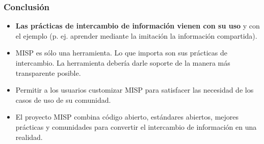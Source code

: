 \begin{frame}
        \frametitle{Conclusión}
        \begin{itemize}
                \item {\bf Las prácticas de intercambio de información vienen con su uso} y con el ejemplo (p. ej. aprender mediante la imitación la información compartida).
                \item MISP es sólo una herramienta. Lo que importa son sus prácticas de intercambio. La herramienta debería darle soporte de la manera más transparente posible.
                \item Permitir a los usuarios customizar MISP para satisfacer las necesidad de los casos de uso de su comunidad.
                \item El proyecto MISP combina código abierto, estándares abiertos, mejores prácticas y comunidades para convertir el intercambio de información en una realidad.
        \end{itemize}
\end{frame}



